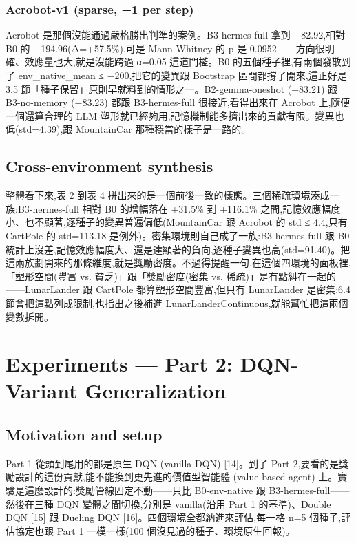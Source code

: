 \documentclass[conference,onecolumn,letterpaper,10pt]{IEEEtran}
\begin{document}
\subsubsection{Acrobot-v1 (sparse, −1 per step)}

Acrobot 是那個沒能通過嚴格勝出判準的案例。B3-hermes-full 拿到 −82.92,相對 B0 的 −194.96(Δ=+57.5\%),可是 Mann-Whitney 的 p 是 0.0952------方向很明確、效應量也大,就是沒能跨過 α=0.05 這道門檻。B0 的五個種子裡,有兩個發散到了 env\_native\_mean ≤ −200,把它的變異跟 Bootstrap 區間都撐了開來,這正好是 3.5 節「種子保留」原則早就料到的情形之一。B2-gemma-oneshot (−83.21) 跟 B3-no-memory (−83.23) 都跟 B3-hermes-full 很接近,看得出來在 Acrobot 上,隨便一個還算合理的 LLM 塑形就已經夠用,記憶機制能多擠出來的貢獻有限。變異也低(std=4.39),跟 MountainCar 那種穩當的樣子是一路的。

\subsection{Cross-environment synthesis}

整體看下來,表 2 到表 4 拼出來的是一個前後一致的樣態。三個稀疏環境湊成一族:B3-hermes-full 相對 B0 的增幅落在 +31.5\% 到 +116.1\% 之間,記憶效應幅度小、也不顯著,逐種子的變異普遍偏低(MountainCar 跟 Acrobot 的 std ≤ 4.4,只有 CartPole 的 std=113.18 是例外)。密集環境則自己成了一族:B3-hermes-full 跟 B0 統計上沒差,記憶效應幅度大、還是達顯著的負向,逐種子變異也高(std=91.40)。把這兩族劃開來的那條維度,就是獎勵密度。不過得提醒一句,在這個四環境的面板裡,「塑形空間(豐富 vs. 貧乏)」跟「獎勵密度(密集 vs. 稀疏)」是有點糾在一起的------LunarLander 跟 CartPole 都算塑形空間豐富,但只有 LunarLander 是密集;6.4 節會把這點列成限制,也指出之後補進 LunarLanderContinuous,就能幫忙把這兩個變數拆開。


\section{Experiments --- Part 2: DQN-Variant Generalization}

\subsection{Motivation and setup}

Part 1 從頭到尾用的都是原生 DQN (vanilla DQN) {[}14{]}。到了 Part 2,要看的是獎勵設計的這份貢獻,能不能換到更先進的價值型智能體 (value-based agent) 上。實驗是這麼設計的:獎勵管線固定不動------只比 B0-env-native 跟 B3-hermes-full------然後在三種 DQN 變體之間切換,分別是 vanilla(沿用 Part 1 的基準)、Double DQN {[}15{]} 跟 Dueling DQN {[}16{]}。四個環境全都納進來評估,每一格 n=5 個種子,評估協定也跟 Part 1 一模一樣(100 個沒見過的種子、環境原生回報)。
\end{document}
